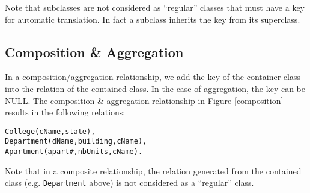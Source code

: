 Note that subclasses are not considered as ``regular'' classes that must have a key for automatic translation. In fact a subclass inherits the key from its superclass.
\subsection{Composition \& Aggregation}
In a composition/aggregation relationship, we add the key of the container class into the relation of the contained class. In the case of aggregation, the key can be NULL. The composition \& aggregation relationship in Figure \ref{composition} results in the following relations:
\begin{lstlisting}
College(cName,state),
Department(dName,building,cName),
Apartment(apart#,nbUnits,cName).
\end{lstlisting}
Note that in a composite relationship, the relation generated from the contained class (e.g. \texttt{Department} above) is not considered as a ``regular'' class.
\ifx\PREAMBLE\undefined

\fi